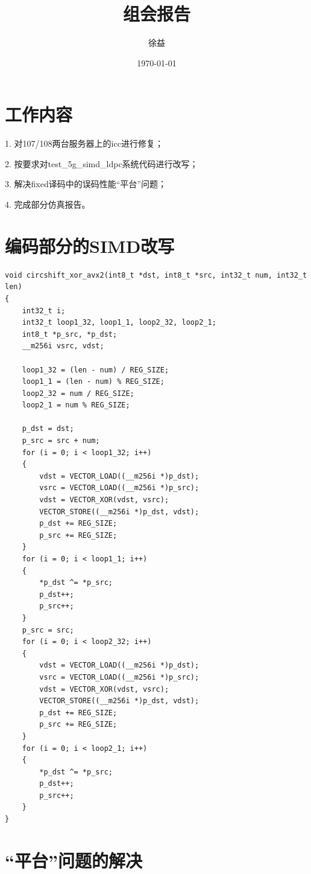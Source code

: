 \documentclass{article}
\title{组会报告}
\author{徐益}
\date{\today}
\begin{document}
\maketitle


\section{工作内容}
1. 对107/108两台服务器上的icc进行修复；

2. 按要求对test\_5g\_simd\_ldpc系统代码进行改写；

3. 解决fixed译码中的误码性能“平台”问题；

4. 完成部分仿真报告。

\section{编码部分的SIMD改写}
\lstset{language=C++}
\begin{lstlisting}
void circshift_xor_avx2(int8_t *dst, int8_t *src, int32_t num, int32_t len)
{
	int32_t i;
	int32_t loop1_32, loop1_1, loop2_32, loop2_1;
	int8_t *p_src, *p_dst;
	__m256i vsrc, vdst;

	loop1_32 = (len - num) / REG_SIZE;
	loop1_1 = (len - num) % REG_SIZE;
	loop2_32 = num / REG_SIZE;
	loop2_1 = num % REG_SIZE;

	p_dst = dst;
	p_src = src + num;
	for (i = 0; i < loop1_32; i++)
	{
		vdst = VECTOR_LOAD((__m256i *)p_dst);
		vsrc = VECTOR_LOAD((__m256i *)p_src);
		vdst = VECTOR_XOR(vdst, vsrc);
		VECTOR_STORE((__m256i *)p_dst, vdst);
		p_dst += REG_SIZE;
		p_src += REG_SIZE;
	}
	for (i = 0; i < loop1_1; i++)
	{
		*p_dst ^= *p_src;
		p_dst++;
		p_src++;
	}
	p_src = src;
	for (i = 0; i < loop2_32; i++)
	{
		vdst = VECTOR_LOAD((__m256i *)p_dst);
		vsrc = VECTOR_LOAD((__m256i *)p_src);
		vdst = VECTOR_XOR(vdst, vsrc);
		VECTOR_STORE((__m256i *)p_dst, vdst);
		p_dst += REG_SIZE;
		p_src += REG_SIZE;
	}
	for (i = 0; i < loop2_1; i++)
	{
		*p_dst ^= *p_src;
		p_dst++;
		p_src++;
	}
}
\end{lstlisting}

\section{“平台”问题的解决}
\end{document}
